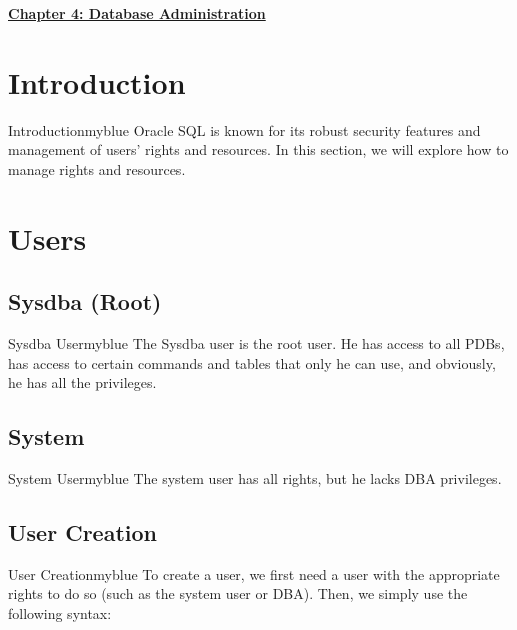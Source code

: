 \newpage 
\null 
\vspace{0.15cm}

\begin{center} 
\Huge{\textbf{\underline{Chapter 4: Database Administration}}}
\end{center}

\vspace{0.25cm}

\setcounter{section}{0}

\vspace{1cm}

\section{Introduction}

\begin{prettyBox}{Introduction}{myblue} 
Oracle SQL is known for its robust security features and management of users' 
rights and resources. In this section, we will explore how to manage rights 
and resources.
\end{prettyBox}

\vspace{0.35cm}

\section{Users}

\subsection{Sysdba (Root)} 
\begin{prettyBox}{Sysdba User}{myblue} 
The Sysdba user is the root user. He has access to all PDBs, has access to
certain commands and tables that only he can use, and obviously, he has all
the privileges.
\end{prettyBox}

\vspace{0.25cm}
\subsection{System}

\begin{prettyBox}{System User}{myblue} 
The system user has all rights, but he lacks DBA privileges.
\end{prettyBox}

\vspace{0.25cm}
\subsection{User Creation}
\begin{prettyBox}{User Creation}{myblue}
To create a user, we first need a user with the appropriate rights to do so 
(such as the system user or DBA).
Then, we simply use the following syntax:
\end{prettyBox}

